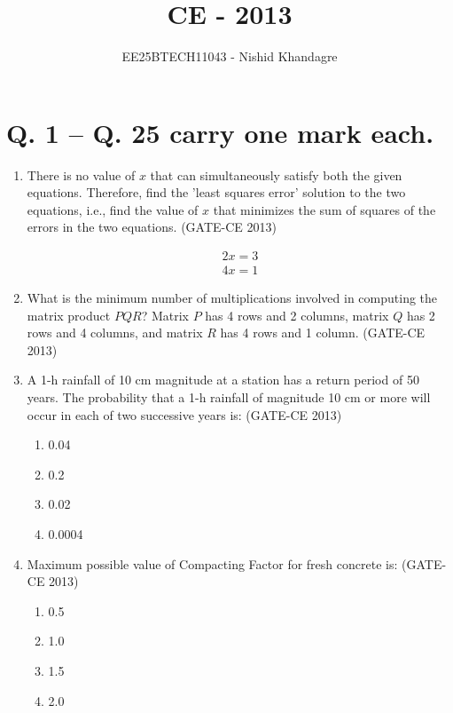 \documentclass[journal,12pt,onecolumn]{article}
\theoremstyle{remark}
\begin{document}
\title{CE - 2013}
\author{EE25BTECH11043 - Nishid Khandagre}
\date{}
\maketitle

\renewcommand{\thefigure}{\theenumi}
\renewcommand{\thetable}{\theenumi}

\section*{Q. 1 -- Q. 25 carry one mark each.}
\begin{enumerate}
    \item There is no value of $x$ that can simultaneously satisfy both the given equations. Therefore, find the 'least squares error' solution to the two equations, i.e., find the value of $x$ that minimizes the sum of squares of the errors in the two equations. \underline{\hspace{3cm}} (GATE-CE 2013)

    \begin{align}
    2x = 3 
    \end{align}
    \begin{align}
     4x = 1
    \end{align}

    \item What is the minimum number of multiplications involved in computing the matrix product $PQR$? Matrix $P$ has 4 rows and 2 columns, matrix $Q$ has 2 rows and 4 columns, and matrix $R$ has 4 rows and 1 column. \underline{\hspace{3cm}} (GATE-CE 2013)
    
    \item A 1-h rainfall of 10 cm magnitude at a station has a return period of 50 years. The probability that a 1-h rainfall of magnitude 10 cm or more will occur in each of two successive years is: (GATE-CE 2013)
    \begin{multicols}{4}
    \begin{enumerate}
        \item 0.04 
        \item 0.2 
        \item 0.02 
        \item 0.0004
    \end{enumerate}
    \end{multicols}
    
    \item Maximum possible value of Compacting Factor for fresh  concrete is: (GATE-CE 2013)
    \begin{multicols}{4}
    \begin{enumerate}
        \item 0.5 
        \item 1.0 
        \item 1.5 
        \item 2.0
    \end{enumerate}
    \end{multicols}
    

\end{enumerate}
\end{document}
